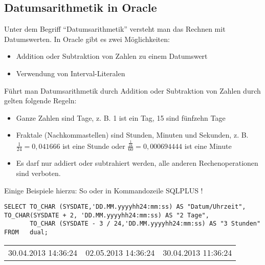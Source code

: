       \subsection{Datumsarithmetik in Oracle}
        Unter dem Begriff \enquote{Datumsarithmetik} versteht man das Rechnen mit Datumswerten. In Oracle gibt es zwei Möglichkeiten:
        \begin{itemize}
          \item Addition oder Subtraktion von Zahlen zu einem Datumswert
          \item Verwendung von Interval-Literalen
        \end{itemize}
        Führt man Datumsarithmetik durch Addition oder Subtraktion von Zahlen durch gelten folgende Regeln:
        \begin{itemize}
          \item Ganze Zahlen sind Tage, z. B. 1 ist ein Tag, 15 sind fünfzehn Tage
          \item Fraktale (Nachkommastellen) sind Stunden, Minuten und Sekunden, z. B. $\frac{1}{24}=0,041666$ ist eine Stunde oder $\frac{\frac{1}{24}}{60}=0,000694444$ ist eine Minute
          \item Es darf nur addiert oder subtrahiert werden, alle anderen Rechenoperationen sind verboten.
        \end{itemize}
        Einige Beispiele hierzu: So oder in Kommandozeile SQLPLUS !
      
        \begin{lstlisting}[language=oracle_sql,caption={Einfache Datumsarithmetik in Oracle},label=sql03_19]
SELECT TO_CHAR (SYSDATE,'DD.MM.yyyyhh24:mm:ss) AS "Datum/Uhrzeit", TO_CHAR(SYSDATE + 2, 'DD.MM.yyyyhh24:mm:ss) AS "2 Tage",
       TO_CHAR (SYSDATE - 3 / 24,'DD.MM.yyyyhh24:mm:ss) AS "3 Stunden"
FROM   dual;
        \end{lstlisting}
        \begin{center}
          \begin{small}
            \tablehead{}
            \tabletail {
            }
            \begin{oraclesql}
              \begin{supertabular}{lll}
                30.04.2013 14:36:24 & 02.05.2013 14:36:24 & 30.04.2013 11:36:24 \\
              \end{supertabular}
            \end{oraclesql}
          \end{small}
        \end{center}
